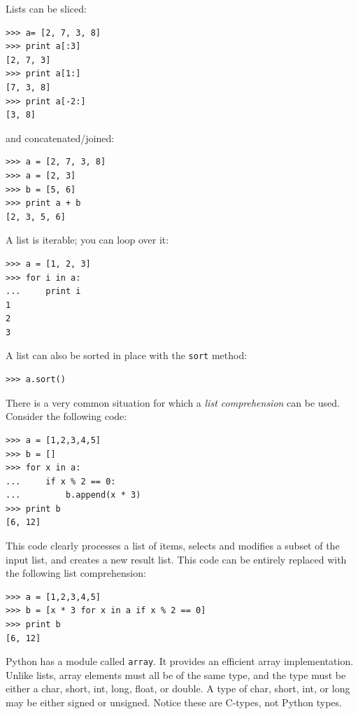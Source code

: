 \documentclass[justified,sixbynine]{tufte-book}
\def\ft{\small\tt}
\theoremstyle{plain}%
\theoremstyle{definition}
\theoremstyle{remark}
\begin{document}
\begin{fullwidth}
\begin{lstlisting}
\end{lstlisting}

Lists can be sliced:

\begin{lstlisting}
>>> a= [2, 7, 3, 8]
>>> print a[:3]
[2, 7, 3]
>>> print a[1:]
[7, 3, 8]
>>> print a[-2:]
[3, 8]
\end{lstlisting}
\noindent and concatenated/joined:

\begin{lstlisting}
>>> a = [2, 7, 3, 8]
>>> a = [2, 3]
>>> b = [5, 6]
>>> print a + b
[2, 3, 5, 6]
\end{lstlisting}

A list is iterable; you can loop over it:

\begin{lstlisting}
>>> a = [1, 2, 3]
>>> for i in a:
...     print i
1
2
3
\end{lstlisting}

A list can also be sorted in place with the {\ft sort} method:

\begin{lstlisting}
>>> a.sort()
\end{lstlisting}


There is a very common situation for which a {\it list comprehension} can be used. Consider the following code:

\begin{lstlisting}
>>> a = [1,2,3,4,5]
>>> b = []
>>> for x in a:
...     if x % 2 == 0:
...         b.append(x * 3)
>>> print b
[6, 12]
\end{lstlisting}

This code clearly processes a list of items, selects and modifies a subset of the input list, and creates a new result list. This code can be entirely replaced with the following list comprehension:

\begin{lstlisting}
>>> a = [1,2,3,4,5]
>>> b = [x * 3 for x in a if x % 2 == 0]
>>> print b
[6, 12]
\end{lstlisting}

Python has a module called {\ft array}. It provides an efficient array implementation. Unlike lists, array elements must all be of the same type, and the type must be either a char, short, int, long, float, or double.  A type of char, short, int, or long may be either signed or unsigned. Notice these are C-types, not Python types.


\end{fullwidth}
\end{document}
